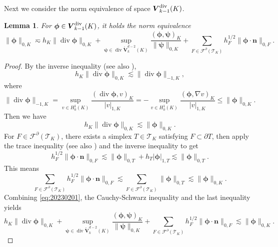 \documentclass[10pt]{amsart}
\newtheorem{lemma}[theorem]{Lemma}
\renewcommand{\div}{\operatorname{div}}
\numberwithin{equation}{section}
\begin{document}
Next we consider the norm equivalence of space $\boldsymbol{V}_{k-1}^{\rm div}(K)$.


\begin{lemma}\label{lem:Vkm1divnormequivalence}
For $\boldsymbol{\phi}\in\boldsymbol{V}_{k-1}^{\rm div}(K)$, it holds the norm equivalence
\begin{equation}\label{eq:Vkm1divnormequivalence}
\|\boldsymbol{\phi}\|_{0,K}\eqsim h_K\|\div\boldsymbol{\phi}\|_{0,K} + \sup_{\boldsymbol{\psi}\in\div\mathring{\boldsymbol{V}}_{k}^{d-2}(K)}\frac{(\boldsymbol{\phi}, \boldsymbol{\psi})_K}{\|\boldsymbol{\psi}\|_{0,K}} +\sum_{F\in\mathcal F^{\partial}(\mathcal T_K)}h_F^{1/2}\|\boldsymbol{\phi}\cdot\boldsymbol{n}\|_{0,F}.
\end{equation}
\end{lemma}
\begin{proof}
By the inverse inequality \cite{Ciarlet1978,Verfuerth2013} (see also \cite[Lemma 10]{Huang2020}),
$$
h_K\|\div\boldsymbol{\phi}\|_{0,K}\lesssim  \|\div\boldsymbol{\phi}\|_{-1,K},
$$ 
where
$$
\|\div\boldsymbol{\phi}\|_{-1,K}=\sup_{v\in H_0^1(K)}\frac{(\div\boldsymbol{\phi}, v)_K}{|v|_{1,K}}=-\sup_{v\in H_0^1(K)}\frac{(\boldsymbol{\phi}, \nabla v)_K}{|v|_{1,K}} \leq \|\boldsymbol{\phi}\|_{0,K}.
$$
Then we have
\begin{equation}\label{eq:20230201}  
h_K\|\div\boldsymbol{\phi}\|_{0,K}\lesssim \|\boldsymbol{\phi}\|_{0,K}.
\end{equation}
For $F\in\mathcal F^{\partial}(\mathcal T_K)$, there exists a simplex $T\in\mathcal T_K$ satisfying $F\subset\partial T$, then apply the trace inequality \cite[Theorem 1.5.1.10]{Grisvard1985} (see also \cite[(2.18)]{BrennerSung2018}) and the inverse inequality to get
$$
h_F^{1/2}\|\boldsymbol{\phi}\cdot\boldsymbol{n}\|_{0,F} \lesssim \|\boldsymbol{\phi}\|_{0,T}+h_T|\boldsymbol{\phi}|_{1,T}\lesssim \|\boldsymbol{\phi}\|_{0,T}.
$$ 
This means
$$
\sum_{F\in\mathcal F^{\partial}(\mathcal T_K)}h_F^{1/2}\|\boldsymbol{\phi}\cdot\boldsymbol{n}\|_{0,F} \lesssim \sum_{F\in\mathcal F^{\partial}(\mathcal T_K)}\|\boldsymbol{\phi}\|_{0,T}\lesssim \|\boldsymbol{\phi}\|_{0,K}.
$$ 
Combining \eqref{eq:20230201}, the Cauchy-Schwarz inequality and the last inequality yields
$$
h_K\|\div\boldsymbol{\phi}\|_{0,K}+\sup_{\boldsymbol{\psi}\in\div\mathring{\boldsymbol{V}}_{k}^{d-2}(K)}\frac{(\boldsymbol{\phi}, \boldsymbol{\psi})_K}{\|\boldsymbol{\psi}\|_{0,K}} +\sum_{F\in\mathcal F^{\partial}(\mathcal T_K)}h_F^{1/2}\|\boldsymbol{\phi}\cdot\boldsymbol{n}\|_{0,F}\lesssim \|\boldsymbol{\phi}\|_{0,K}.
$$


\end{proof}
\end{document}
